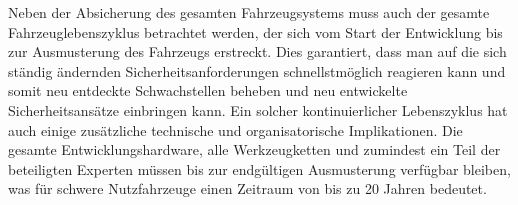 Neben der Absicherung des gesamten Fahrzeugsystems muss auch der 
gesamte Fahrzeuglebenszyklus betrachtet werden, der sich 
vom Start der Entwicklung bis zur Ausmusterung des Fahrzeugs erstreckt. Dies garantiert, 
dass man auf die sich ständig ändernden Sicherheitsanforderungen schnellstmöglich 
reagieren kann und somit neu entdeckte Schwachstellen beheben und neu entwickelte 
Sicherheitsansätze einbringen kann.
\newline
Ein solcher kontinuierlicher Lebenszyklus hat auch einige zusätzliche technische 
und organisatorische Implikationen. Die gesamte Entwicklungshardware, alle 
Werkzeugketten und zumindest ein Teil der beteiligten Experten müssen bis zur endgültigen 
Ausmusterung verfügbar bleiben, was für schwere Nutzfahrzeuge einen Zeitraum
von bis zu 20 Jahren bedeutet.
